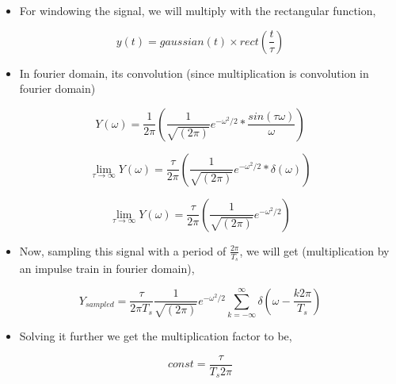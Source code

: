 \documentclass[11pt]{article}
\providecommand{\tightlist}{%
      \setlength{\itemsep}{0pt}\setlength{\parskip}{0pt}}
\begin{document}
\begin{itemize}
\tightlist
\item
  For windowing the signal, we will multiply with the rectangular
  function,
\end{itemize}

\begin{equation}
y(t) = gaussian(t) \times rect(\frac{t}{\tau})
\end{equation}

\begin{itemize}
\tightlist
\item
  In fourier domain, its convolution (since multiplication is
  convolution in fourier domain)
\end{itemize}

\begin{equation}
Y(\omega) = \frac{1}{2\pi}(\frac{1}{\sqrt{(2\pi)}}e^{-\omega^2/2} * \frac{sin(\tau \omega)}{\omega})
\end{equation}

\begin{equation}
\lim_{\tau \to\infty} Y(\omega) = \frac{\tau}{2\pi}(\frac{1}{\sqrt{(2\pi)}}e^{-\omega^2/2} * \delta(\omega))
\end{equation}

\begin{equation}
\lim_{\tau \to\infty} Y(\omega) = \frac{\tau}{2\pi}(\frac{1}{\sqrt{(2\pi)}}e^{-\omega^2/2})
\end{equation}

\begin{itemize}
\tightlist
\item
  Now, sampling this signal with a period of \(\frac{2\pi}{T_s}\), we
  will get (multiplication by an impulse train in fourier domain),
\end{itemize}

\begin{equation}
Y_{sampled} = \frac{\tau}{2\pi T_s}\frac{1}{\sqrt{(2\pi)}}e^{-\omega^2/2} \sum_{k = -\infty}^{\infty}\delta(\omega - \frac{k2\pi}{T_s})
\end{equation}

\begin{itemize}
\tightlist
\item
  Solving it further we get the multiplication factor to be,
\end{itemize}

\begin{equation}
const = \frac{\tau}{T_s 2\pi}
\end{equation}
\end{document}
